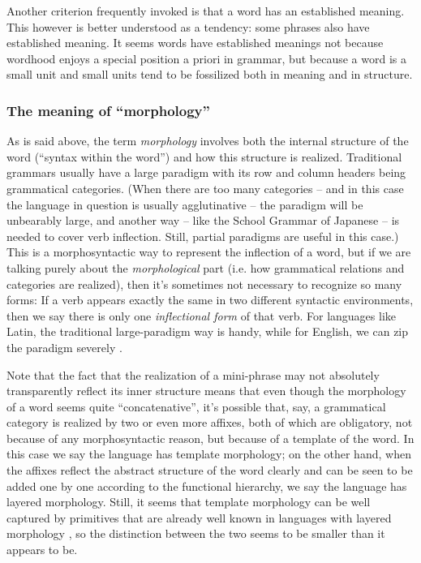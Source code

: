 \documentclass[UTF8, a4paper, oneside, scheme=plain, 12pt]{ctexbook}
\newcommand*{\citesec}[1]{\S~{#1}}
\newcommand*{\citechap}[1]{Ch.~{#1}}
\newcommand*{\citechapsec}[2]{\citechap{#1}.\citesec{#2}}
\newcommand*{\term}[1]{\emph{#1}}
\begin{document}
{Another criterion frequently invoked is that 
a word has an established meaning.
This however is better understood as a tendency:
some phrases also have established meaning.
It seems words have established meanings not because 
wordhood enjoys a special position a priori in grammar, 
but because a word is a small unit 
and small units tend to be fossilized both in meaning and in structure.

\subsubsection{The meaning of ``morphology''}

As is said above, the term \term{morphology}
involves both the internal structure of the word 
(``syntax within the word'')
and how this structure is realized.
Traditional grammars usually have a large paradigm
with its row and column headers being grammatical categories.
(When there are too many categories 
-- and in this case the language in question is usually agglutinative -- 
the paradigm will be unbearably large, 
and another way -- like the School Grammar of Japanese -- is needed to cover verb inflection.
Still, partial paradigms are useful in this case.) 
This is a morphosyntactic way to represent the inflection of a word, 
but if we are talking purely about the \emph{morphological} part
(i.e. how grammatical relations and categories are realized),
then it's sometimes not necessary to recognize so many forms:
If a verb appears exactly the same in two different syntactic environments,
then we say there is only one \emph{inflectional form} of that verb.
For languages like Latin, 
the traditional large-paradigm way is handy,
while for English, we can zip the paradigm severely \citep[\citechapsec{3}{1.2}]{cgel}.

Note that the fact that the realization of a mini-phrase 
may not absolutely transparently reflect its inner structure 
means that even though the morphology of a word 
seems quite ``concatenative'',
it's possible that, say, 
a grammatical category is realized by two or even more affixes, 
both of which are obligatory,
not because of any morphosyntactic reason, 
but because of a template of the word. 
In this case we say the language has template morphology;
on the other hand, 
when the affixes reflect the abstract structure of the word clearly 
and can be seen to be added one by one 
according to the functional hierarchy,
we say the language has layered morphology.
Still, it seems that template morphology
can be well captured by primitives that are already well known 
in languages with layered morphology \cite{oxford2019fission},
so the distinction between the two seems to be smaller than it appears to be.

}
\end{document}
